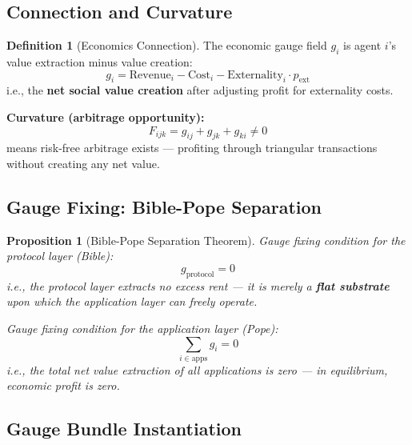 \documentclass[12pt,a4paper]{article}
\theoremstyle{plain}
\newtheorem{proposition}[theorem]{Proposition}
\theoremstyle{definition}
\newtheorem{definition}[theorem]{Definition}
\begin{document}
\subsection{Connection and Curvature}

\begin{definition}[Economics Connection]
The economic gauge field $g_i$ is agent $i$'s value extraction minus value creation:
\begin{equation}
    g_i = \text{Revenue}_i - \text{Cost}_i - \text{Externality}_i \cdot p_{\text{ext}}
\end{equation}
i.e., the \textbf{net social value creation} after adjusting profit for externality costs.

\textbf{Curvature (arbitrage opportunity):}
\begin{equation}
    F_{ijk} = g_{ij} + g_{jk} + g_{ki} \neq 0
\end{equation}
means risk-free arbitrage exists — profiting through triangular transactions without creating any net value.
\end{definition}

\subsection{Gauge Fixing: Bible-Pope Separation}

\begin{proposition}[Bible-Pope Separation Theorem]
Gauge fixing condition for the protocol layer (Bible):
\begin{equation}
    g_{\text{protocol}} = 0
\end{equation}
i.e., the protocol layer extracts no excess rent — it is merely a \textbf{flat substrate} upon which the application layer can freely operate.

Gauge fixing condition for the application layer (Pope):
\begin{equation}
    \sum_{i \in \text{apps}} g_i = 0
\end{equation}
i.e., the total net value extraction of all applications is zero — in equilibrium, economic profit is zero.
\end{proposition}

\subsection{Gauge Bundle Instantiation}
\end{document}
